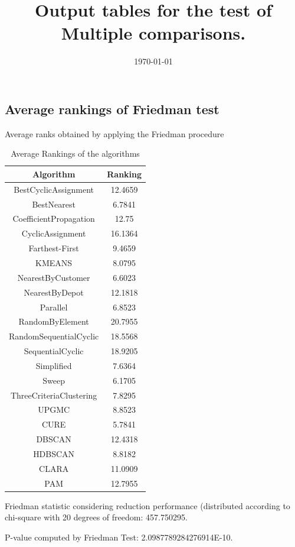 \documentclass[a4paper,10pt]{article}
\title{Output tables for the test of Multiple comparisons.}
\author{}
\date{\today}
\begin{document}
\begin{landscape}
\pagestyle{empty}
\maketitle
\thispagestyle{empty}
\section{Average rankings of Friedman test}



Average ranks obtained by applying the Friedman procedure

\begin{table}[!htp]
\centering
\begin{tabular}{|c|c|}\hline
Algorithm&Ranking\\\hline
BestCyclicAssignment & 12.4659\\
BestNearest & 6.7841\\
CoefficientPropagation & 12.75\\
CyclicAssignment & 16.1364\\
Farthest-First & 9.4659\\
KMEANS & 8.0795\\
NearestByCustomer & 6.6023\\
NearestByDepot & 12.1818\\
Parallel & 6.8523\\
RandomByElement & 20.7955\\
RandomSequentialCyclic & 18.5568\\
SequentialCyclic & 18.9205\\
Simplified & 7.6364\\
Sweep & 6.1705\\
ThreeCriteriaClustering & 7.8295\\
UPGMC & 8.8523\\
CURE & 5.7841\\
DBSCAN & 12.4318\\
HDBSCAN & 8.8182\\
CLARA & 11.0909\\
PAM & 12.7955\\
\hline
\end{tabular}
\caption{Average Rankings of the algorithms}
\end{table}

Friedman statistic considering reduction performance (distributed according to chi-square with 20 degrees of freedom: 457.750295.

P-value computed by Friedman Test: 2.0987789284276914E-10.\newline


\end{landscape}
\end{document}
